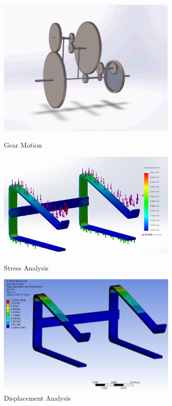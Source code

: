 \documentclass[10pt, letterpaper]{article}
\begin{document}
\begin{figure}[!b]
        \begin{minipage}[c]{0.33\linewidth}
            \centering
            \includegraphics[width=0.8\textwidth]{fig/Mechanical Design/gear motion.jpg}
            \caption{Gear Motion}
        \end{minipage} %
        \begin{minipage}[c]{0.33\linewidth}
            \centering
            \includegraphics[width=0.8\textwidth]{fig/Mechanical Design/Solidworks應力位移分析.png}
            \caption{Stress Analysis}
        \end{minipage}%
        \begin{minipage}[c]{0.33\linewidth}
            \centering
            \includegraphics[width=0.8\textwidth]{fig/Mechanical Design/Ansys應力位移分析.png}
            \caption{Displacement Analysis}
        \end{minipage}


\end{figure}
\end{document}
